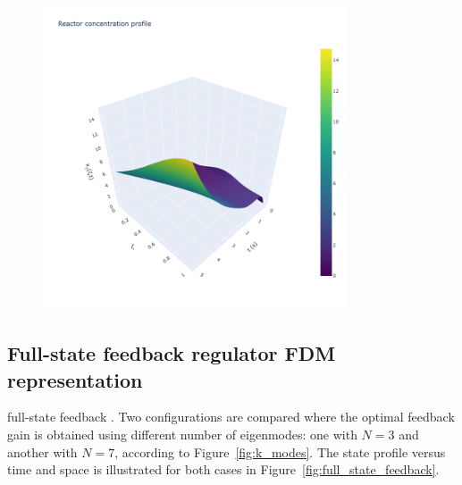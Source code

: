 \DIFdelbegin 
\begin{figure}[!htbp]
    \centering
    \includegraphics[width=0.8\textwidth,trim=0 0 100 0,clip]{Figures/3D_x1_openloop.png}
    \caption{}
    \label{fig:3D_x1_openloop}
\end{figure} 
\DIFdelend

\subsection{Full-state feedback regulator FDM representation}


\DIFdelbegin {}\DIFdelend \DIFaddbegin {}\DIFaddend full-state feedback \DIFdelbegin {}\DIFdelend \DIFaddbegin {}\DIFaddend . Two configurations are compared where the optimal feedback gain is obtained using different number of eigenmodes: one with $N=3$ and another with $N=7$, according to Figure~\ref{fig:k_modes}. The state profile versus time and space is illustrated for both cases in Figure~\ref{fig:full_state_feedback}. 

